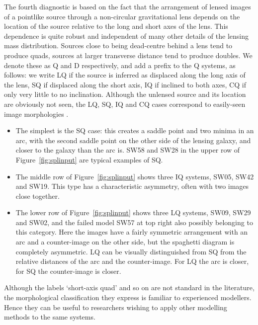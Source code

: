 The fourth diagnostic is based on the fact that the arrangement of
lensed images of a pointlike source through a non-circular
gravitational lens depends on the location of the source relative to
the long and short axes of the lens.  This dependence is quite robust
and independent of many other details of the lensing mass
distribution.  Sources close to being dead-centre behind a lens tend
to produce quads, sources at larger transverse distance tend to
produce doubles.  We denote these as Q and D respectively, and add a
prefix to the Q systems, as follows: we write LQ if the source is
inferred as displaced along the long axis of the lens, SQ if displaced
along the short axis, IQ if inclined to both axes, CQ if only very little to
no inclination.  Although the
unlensed source and its location are obviously not seen, the LQ, SQ, IQ and CQ
cases correspond to easily-seen image morphologies \citep[see,
  e.g.,][]{2003AJ....125.2769S}.
\begin{itemize}
\item The simplest is the SQ case: this creates a saddle point and two
  minima in an arc, with the second saddle point on the other side of
  the lensing galaxy, and closer to the galaxy than the arc is.  SW58
  and SW28 in the upper row of Figure~\ref{fig:splinput} are typical
  examples of SQ.
\item The middle row of Figure~\ref{fig:splinput} shows three IQ
  systems, SW05, SW42 and SW19.  This type has a characteristic
  asymmetry, often with two images close together.
\item The lower row of Figure~\ref{fig:splinput} shows three LQ
  systems, SW09, SW29 and SW02, and the failed model SW57 at top right
  also possibly belonging to this category.  Here the images have a
  fairly symmetric arrangement with an arc and a counter-image on the
  other side, but the spaghetti diagram is completely asymmetric.  LQ
  can be visually distinguished from SQ from the relative distances of
  the arc and the counter-image.  For LQ the arc is closer, for SQ the
  counter-image is closer.
\end{itemize}
Although the labels `short-axis quad' and so on are not standard in
the literature, the morphological classification they express is
familiar to experienced modellers.  Hence they can be useful to
researchers wishing to apply other modelling methods to the same
systems.

\endinput


Let us first consider from SW05 (J143454.4+522850).
In SW05 there are four distinct lensed images, and the spaghetti
diagram proposes that they are a minimum nearest to the lensing
galaxy, a close minimum-saddle pair, and a minimum further away. In
Table~\ref{tab:models} we refer to such configurations as IQ for
inclined quad.

